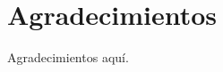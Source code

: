 
\begingroup
\let\clearpage\relax
\let\cleardoublepage\relax
\let\cleardoublepage\relax
\chapter*{Agradecimientos}
Agradecimientos aquí.


\endgroup